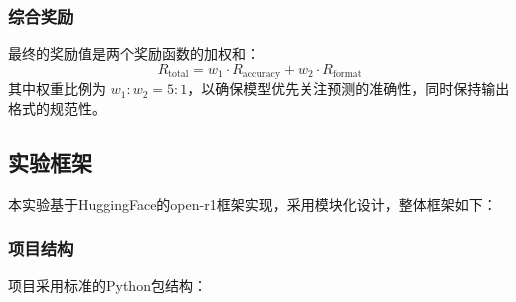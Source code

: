 \documentclass[a4paper, 12pt]{article}
\begin{document}
\subsubsection{综合奖励}
最终的奖励值是两个奖励函数的加权和：
\begin{equation}
    R_{\text{total}} = w_1 \cdot R_{\text{accuracy}} + w_2 \cdot R_{\text{format}}
\end{equation}
其中权重比例为 $w_1 : w_2 = 5 : 1$，以确保模型优先关注预测的准确性，同时保持输出格式的规范性。

\subsection{实验框架}
本实验基于HuggingFace的open-r1框架实现，采用模块化设计，整体框架如下：

\subsubsection{项目结构}
项目采用标准的Python包结构：
\end{document}
